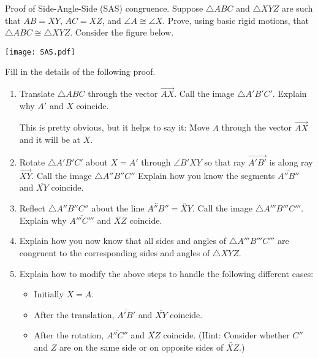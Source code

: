 \documentclass[instructornotes,nooutcomes]{ximera}
\begin{document}
\begin{problem}
Proof of Side-Angle-Side (SAS) congruence.  Suppose $\triangle ABC$ and $\triangle XYZ$ are such that $AB=XY$, $AC=XZ$, and $\angle A \cong \angle X$.  Prove, using basic rigid motions, that $\triangle ABC \cong \triangle XYZ$.  Consider the figure below.  
\begin{image}
\texttt{[image: SAS.pdf]}
\end{image}
Fill in the details of the following proof.  
\begin{enumerate}
\item Translate $\triangle ABC$ through the vector $\overrightarrow{AX}$.  Call the image $\triangle A'B'C'$.  Explain why $A'$ and $X$ coincide. 

\begin{teachingnote}
This is pretty obvious, but it helps to say it:  Move $A$ through 
the vector $\overrightarrow{AX}$ and it will be at $X$.  
\end{teachingnote}
\vspace{1in}
\item Rotate $\triangle A'B'C'$ about $X=A'$ through $\angle B'XY$ so that ray $\overrightarrow{A'B'}$ is along ray $\overrightarrow{XY}$.  Call the image $\triangle A''B''C''$   Explain how you know the segments $\overline{A''B''}$ and $\overline{XY}$ coincide. 
\vspace{1in}
\item Reflect $\triangle A''B''C''$ about the line $\overleftrightarrow{A''B''} = \overleftrightarrow{XY}$.  Call the image $\triangle A'''B'''C'''$.  Explain why $\overline{A'''C'''}$ and $\overline{XZ}$ coincide.
\vspace{1in}
\item Explain how you now know that all sides and angles of $\triangle A'''B'''C'''$ are congruent to the corresponding sides and angles of $\triangle XYZ$.  
\vspace{1in}
\item Explain how to modify the above steps to handle the following different cases: 
\begin{itemize}
\item Initially $X = A$. 
\item After the translation, $\overline{A'B'}$ and $\overline{XY}$ coincide. 
\item After the rotation, $\overline{A''C''}$ and $\overline{XZ}$ coincide.  (Hint:  Consider whether $C''$ and $Z$ are on the same side or on opposite sides of $\overleftrightarrow{XZ}$.)  
\end{itemize}
\end{enumerate}
\vfill
\end{problem}
\end{document}
